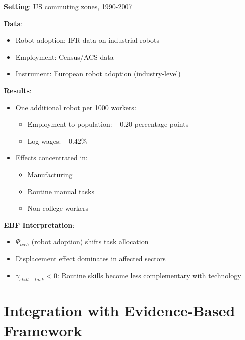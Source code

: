 \begin{tcolorbox}[colback=green!5!white,colframe=green!75!black,title=Worked Example: Robot Adoption 1990-2007]
\textbf{Setting}: US commuting zones, 1990-2007

\textbf{Data}:
\begin{itemize}
    \item Robot adoption: IFR data on industrial robots
    \item Employment: Census/ACS data
    \item Instrument: European robot adoption (industry-level)
\end{itemize}

\textbf{Results}:
\begin{itemize}
    \item One additional robot per 1000 workers:
    \begin{itemize}
        \item Employment-to-population: $-0.20$ percentage points
        \item Log wages: $-0.42\%$
    \end{itemize}
    \item Effects concentrated in:
    \begin{itemize}
        \item Manufacturing
        \item Routine manual tasks
        \item Non-college workers
    \end{itemize}
\end{itemize}

\textbf{EBF Interpretation}:
\begin{itemize}
    \item $\Psi_{tech}$ (robot adoption) shifts task allocation
    \item Displacement effect dominates in affected sectors
    \item $\gamma_{skill-task} < 0$: Routine skills become less complementary with technology
\end{itemize}
\end{tcolorbox}

\section{Integration with Evidence-Based Framework}

